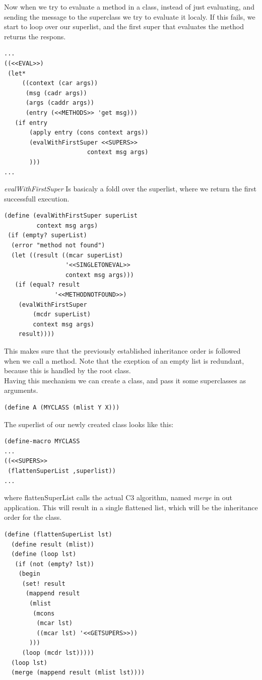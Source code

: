 \documentclass[10pt,a4paper]{scrartcl}
\begin{document}
\begin{multicols}{2}
Now when we try to evaluate a method in a class, instead of just evaluating, and sending the message to the superclass we try to evaluate it localy. If this fails, we start to loop over our superlist, and the first super that evaluates the method returns the respons.
\begin{lstlisting}
...
((<<EVAL>>)
 (let*
     ((context (car args))
      (msg (cadr args))
      (args (caddr args))
      (entry (<<METHODS>> 'get msg)))
   (if entry
       (apply entry (cons context args))
       (evalWithFirstSuper <<SUPERS>>
                       context msg args)
       )))
...
\end{lstlisting}
\textit{evalWithFirstSuper} Is basicaly a foldl over the superlist, where we return the first successfull execution.
\begin{lstlisting}
(define (evalWithFirstSuper superList
         context msg args)
 (if (empty? superList)
  (error "method not found") 
  (let ((result ((mcar superList)
                 '<<SINGLETONEVAL>>
                 context msg args)))
   (if (equal? result
              '<<METHODNOTFOUND>>)
    (evalWithFirstSuper
        (mcdr superList)
        context msg args)
    result))))
\end{lstlisting}
This makes sure that the previously established inheritance order is followed when we call a method. Note that the exeption of an empty list is redundant, because this is handled by the root class.\\
Having this mechanism we can create a class, and pass it some superclasses as arguments.
\begin{lstlisting}
(define A (MYCLASS (mlist Y X)))
\end{lstlisting}
The superlist of our newly created class looks like this:
\begin{lstlisting}
(define-macro MYCLASS
...
((<<SUPERS>>
 (flattenSuperList ,superlist))
...
\end{lstlisting}
where flattenSuperList calls the actual C3 algorithm, named \textit{merge} in out application. This will result in a single flattened list, which will be the inheritance order for the class.
\begin{lstlisting}
(define (flattenSuperList lst)
  (define result (mlist))
  (define (loop lst)
   (if (not (empty? lst))
    (begin
     (set! result 
      (mappend result
       (mlist
        (mcons
         (mcar lst)
         ((mcar lst) '<<GETSUPERS>>))
       )))
     (loop (mcdr lst)))))
  (loop lst)
  (merge (mappend result (mlist lst))))
\end{lstlisting}

\end{multicols}
\end{document}
